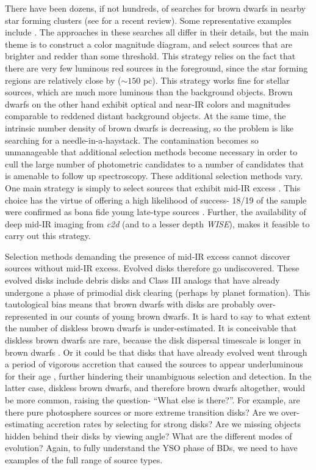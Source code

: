 There have been dozens, if not hundreds, of searches for brown dwarfs in nearby star forming clusters (see \citet{2012ARA&A..50...65L} for a recent review).  Some representative examples include \cite{2004ApJ...602..816L,2012A&A...539A.151A,2014ApJ...785..159M}.  The approaches in these searches all differ in their details, but the main theme is to construct a color magnitude diagram, and select sources that are brighter and redder than some threshold.  This strategy relies on the fact that there are very few luminous red sources in the foreground, since the star forming regions are relatively close by ($\sim150$ pc).  This strategy works fine for stellar sources, which are much more luminous than the background objects.  Brown dwarfs on the other hand exhibit optical and near-IR colors and magnitudes comparable to reddened distant background objects.  At the same time, the intrinsic number density of brown dwarfs is decreasing, so the problem is like searching for a needle-in-a-haystack.  The contamination becomes so unmanageable that additional selection methods become necessary in order to cull the large number of photometric candidates to a number of candidates that is amenable to follow up spectroscopy.  These additional selection methods vary.  One main strategy is simply to select sources that exhibit mid-IR excess \citep{allers06}.  This choice has the virtue of offering a high likelihood of success- 18/19 of the \citet{allers06} sample were confirmed as bona fide young late-type sources \citep{2011ASPC..448..633G}.  Further, the availability of deep mid-IR imaging from \emph{c2d} (and to a lesser depth \emph{WISE}), makes it feasible to carry out this strategy.  

Selection methods demanding the presence of mid-IR excess cannot discover sources without mid-IR excess.  Evolved disks therefore go undiscovered.  These evolved disks include debris disks and Class III analogs that have already undergone a phase of primodial disk clearing (perhaps by planet formation).  This tautological bias means that brown dwarfs with disks are probably over-represented in our counts of young brown dwarfs.  It is hard to say to what extent the number of diskless brown dwarfs is under-estimated.  It is conceivable that diskless brown dwarfs are rare, because the disk dispersal timescale is longer in brown dwarfs \citep{2008ApJ...681.1584R}.  Or it could be that disks that have already evolved went through a period of vigorous accretion that caused the sources to appear underluminous for their age \citep{2009ApJ...702L..27B}, further hindering their unambiguous selection and detection.  In the latter case, diskless brown dwarfs, and therefore brown dwarfs altogether, would be more common, raising the question- ``What else is there?''.  For example, are there pure photosphere sources or more extreme transition disks?  Are we over-estimating accretion rates by selecting for strong disks?  Are we missing objects hidden behind their disks by viewing angle?  What are the different modes of evolution?  Again, to fully understand the YSO phase of BDs, we need to have examples of the full range of source types. 

